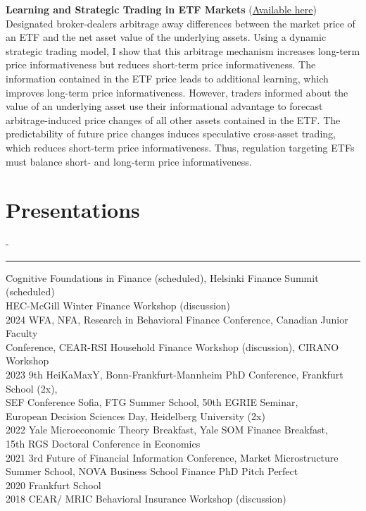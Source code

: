 \documentclass{res}
\newcommand{\sectionline}{	\vspace{-8pt}
	{\parindent-\sectionwidth \rule{\resumewidth}{0.4pt}} }
\newenvironment{nstabbing}
  {\setlength{\topsep}{-\parskip}%
   \setlength{\partopsep}{0pt}%
   \tabbing}
  {\endtabbing}
\begin{document}
\begin{resume}
    \textbf{Learning and Strategic Trading in ETF Markets} (\href{http://maxvoigt.github.io/files/Voigt2023_ETFMarkets.pdf}{Available here}) \\
    Designated broker-dealers arbitrage away differences between the market price of an ETF and the net asset value of the underlying assets. Using a dynamic strategic trading model, I show that this arbitrage mechanism increases long-term price informativeness but reduces short-term price informativeness. The information contained in the ETF price leads to additional learning, which improves long-term price informativeness. However, traders informed about the value of an underlying asset use their informational advantage to forecast arbitrage-induced price changes of all other assets contained in the ETF. The predictability of future price changes induces speculative cross-asset trading, which reduces short-term price informativeness. Thus, regulation targeting ETFs must balance short- and long-term price informativeness.
    
\section{Presentations} 	
	\sectionline
	\vspace{-3ex}
    \begin{nstabbing}
	2025 \qquad \qquad \qquad \= Cognitive Foundations in Finance (scheduled), Helsinki Finance Summit (scheduled)\\
	\> HEC-McGill Winter Finance Workshop (discussion)\\[0.5ex]
	2024 \> WFA, NFA, Research in Behavioral Finance Conference, Canadian Junior Faculty \\
	\> 	Conference, CEAR-RSI Household Finance Workshop (discussion), 
	CIRANO Workshop \\[0.5ex]
	2023 \> 9th HeiKaMaxY, Bonn-Frankfurt-Mannheim PhD Conference, Frankfurt School (2x), \\
	\>  SEF Conference Sofia, FTG Summer School, 50th EGRIE Seminar,\\
	\>  European Decision Sciences Day, Heidelberg University (2x) \\[0.5ex]
    2022 \> Yale Microeconomic Theory Breakfast, Yale SOM Finance Breakfast, \\
    \> 15th RGS Doctoral Conference in Economics \\[0.5ex]
    2021 \> 3rd Future of Financial Information Conference, Market Microstructure \\
    \> Summer School, NOVA Business School Finance PhD Pitch Perfect \\[0.5ex]
    2020 \> Frankfurt School \\[0.5ex]
	2018 \> CEAR/ MRIC Behavioral Insurance Workshop (discussion)
    \end{nstabbing}
    

\end{resume}
\end{document}

